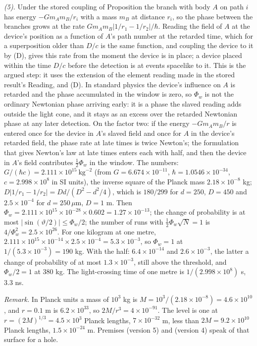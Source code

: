 \emph{(5).} Under the stored coupling of Proposition  the branch with body $A$ on path $i$ has energy $-Gm_{A}m_{B}/r_{i}$ with a mass $m_{B}$ at distance $r_{i}$, so the phase between the branches grows at the rate $Gm_{A}m_{B}|1/r_{1} - 1/r_{2}|/\hbar$. Reading the field of $A$ at the device's position as a function of $A$'s path number at the retarded time, which for a superposition older than $D/c$ is the same function, and coupling the device to it by (D), gives this rate from the moment the device is in place; a device placed within the time $D/c$ before the detection is at events spacelike to it. This is the argued step: it uses the extension of the element reading made in the stored result's Reading, and (D). In standard physics the device's influence on $A$ is retarded and the phase accumulated in the window is zero, so $\Phi_{w}$ is not the ordinary Newtonian phase arriving early: it is a phase the slaved reading adds outside the light cone, and it stays as an excess over the retarded Newtonian phase at any later detection. On the factor two: if the energy $-Gm_{A}m_{B}/r$ is entered once for the device in $A$'s slaved field and once for $A$ in the device's retarded field, the phase rate at late times is twice Newton's; the formulation that gives Newton's law at late times enters each with half, and then the device in $A$'s field contributes $\tfrac12\Phi_{w}$ in the window. The numbers: $G/(\hbar c) = 2.111 \times 10^{15}\ \mathrm{kg}^{-2}$ (from $G = 6.674 \times 10^{-11}$, $\hbar = 1.0546 \times 10^{-34}$, $c = 2.998 \times 10^{8}$ in SI units), the inverse square of the Planck mass $2.18 \times 10^{-8}$ kg; $D|1/r_{1} - 1/r_{2}| = Dd/(D^{2} - d^{2}/4)$, which is $180/299$ for $d = 250$, $D = 450$ and $2.5 \times 10^{-4}$ for $d = 250\,\mu$m, $D = 1$ m. Then $\Phi_{w} = 2.111 \times 10^{15} \times 10^{-28} \times 0.602 = 1.27 \times 10^{-13}$; the change of probability is at most $|\sin(\vartheta/2)| \le \Phi_{w}/2$; the number of runs with $\tfrac12\Phi_{w}\sqrt{N} = 1$ is $4/\Phi_{w}^{2} = 2.5 \times 10^{26}$. For one kilogram at one metre, $2.111 \times 10^{15} \times 10^{-14} \times 2.5 \times 10^{-4} = 5.3 \times 10^{-3}$, so $\Phi_{w} = 1$ at $1/(5.3 \times 10^{-3}) = 190$ kg. With the half: $6.4 \times 10^{-14}$ and $2.6 \times 10^{-3}$, the latter a change of probability of at most $1.3 \times 10^{-3}$, still above the threshold, and $\Phi_{w}/2 = 1$ at $380$ kg. The light-crossing time of one metre is $1/(2.998 \times 10^{8})$ s, $3.3$ ns.

\emph{Remark.} In Planck units a mass of $10^{3}$ kg is $M = 10^{3}/(2.18 \times 10^{-8}) = 4.6 \times 10^{10}$, and $r = 0.1$ m is $6.2 \times 10^{33}$, so $2M/r^{3} = 4 \times 10^{-91}$. The level is one at $r = (2M)^{1/3} = 4.5 \times 10^{3}$ Planck lengths, $7 \times 10^{-32}$ m, less than $2M = 9.2 \times 10^{10}$ Planck lengths, $1.5 \times 10^{-24}$ m. Premises  (version 5) and  (version 4) speak of that surface for a hole.

